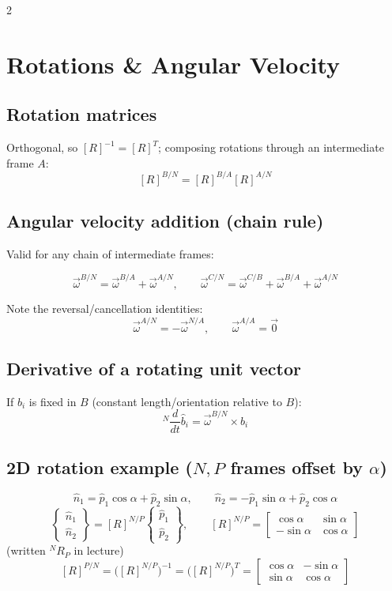 \documentclass[10pt]{article}
\newcommand{\rate}[2]{{}^{#1}\dfrac{d}{dt}#2}
\begin{document}
\begin{multicols}{2}
\section*{Rotations \& Angular Velocity}

\subsection*{Rotation matrices}
Orthogonal, so $[R]^{-1} = [R]^{T}$; composing rotations through an intermediate frame $A$:
\[
    [R]^{B/N} = [R]^{B/A}[R]^{A/N}
\]

\subsection*{Angular velocity addition (chain rule)}
Valid for any chain of intermediate frames:
\begin{keybox}
\[
    \vec\omega^{B/N} = \vec\omega^{B/A} + \vec\omega^{A/N},
    \qquad
    \vec\omega^{C/N} = \vec\omega^{C/B}+\vec\omega^{B/A}+\vec\omega^{A/N}
\]
\end{keybox}
Note the reversal/cancellation identities:
\[
    \vec\omega^{A/N} = -\vec\omega^{N/A}, \qquad \vec\omega^{A/A} = \vec 0
\]

\subsection*{Derivative of a rotating unit vector}
If $\hat b_i$ is fixed in $B$ (constant length/orientation relative to $B$):
\[
    \rate{N}{\hat b_i} = \vec\omega^{B/N}\times\hat b_i
\]

\subsection*{2D rotation example ($N,P$ frames offset by $\alpha$)}
\[
    \hat n_1 = \hat p_1\cos\alpha+\hat p_2\sin\alpha, \qquad \hat n_2=-\hat p_1\sin\alpha+\hat p_2\cos\alpha
\]
\[
    \begin{Bmatrix}\hat n_1\\\hat n_2\end{Bmatrix} = [R]^{N/P}\begin{Bmatrix}\hat p_1\\\hat p_2\end{Bmatrix},
    \qquad
    [R]^{N/P} = \begin{bmatrix}\cos\alpha&\sin\alpha\\-\sin\alpha&\cos\alpha\end{bmatrix}
\]
(written ${}^{N}R_P$ in lecture)
\[
    [R]^{P/N} = \big([R]^{N/P}\big)^{-1} = \big([R]^{N/P}\big)^{T} = \begin{bmatrix}\cos\alpha&-\sin\alpha\\\sin\alpha&\cos\alpha\end{bmatrix}
\]


\end{multicols}
\end{document}

